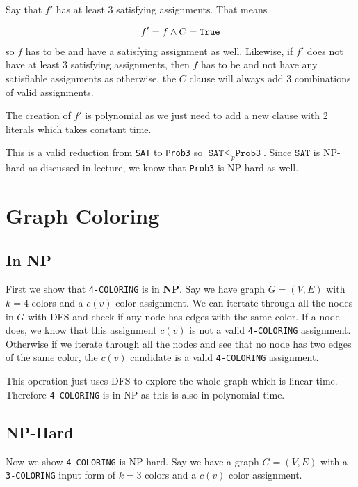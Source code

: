\documentclass{article}
\begin{document}
\begin{enumerate}
                Say that $f'$ has at least 3 satisfying assignments. That means
                
                \begin{align*}
                        f' = f \land C = \texttt{True}
                \end{align*} 
                so $f$ has to be \True and have a satisfying assignment as well. 
                Likewise, if $f'$ does not have at least 3 satisfying assignments, then $f$ has to be \False and not have any satisfiable assignments as otherwise, the $C$ clause will always add 3 combinations of valid assignments.

                The creation of $f'$ is polynomial as we just need to add a new clause with 2 literals which takes constant time.

                This is a valid reduction from \texttt{SAT} to \texttt{Prob3} so $\texttt{SAT} \leq_p \texttt{Prob3}$.
                Since $\texttt{SAT}$ is NP-hard as discussed in lecture, we know that \texttt{Prob3} is NP-hard as well.
\end{enumerate}
\newpage
\section{Graph Coloring}
\subsection{In NP}
First we show that \texttt{4-COLORING} is in \textbf{NP}.
Say we have graph $G = (V, E)$ with $k=4$ colors and a $c(v)$ color assignment. We can itertate through all the nodes in $G$ with DFS and check if any node has edges with the same color.
If a node does, we know that this assignment $c(v)$ is not a valid \texttt{4-COLORING} assignment. Otherwise if we iterate through all the nodes and see that no node has two edges of the same color,
the $c(v)$ candidate is a valid \texttt{4-COLORING} assignment.

This operation just uses DFS to explore the whole graph which is linear time. Therefore \texttt{4-COLORING} is in NP as this is also in polynomial time.

\subsection{NP-Hard}
Now we show \texttt{4-COLORING} is NP-hard.
Say we have a graph $G = (V, E)$ with a \texttt{3-COLORING} input form of $k=3$ colors and a $c(v)$ color assignment.
\end{document}
